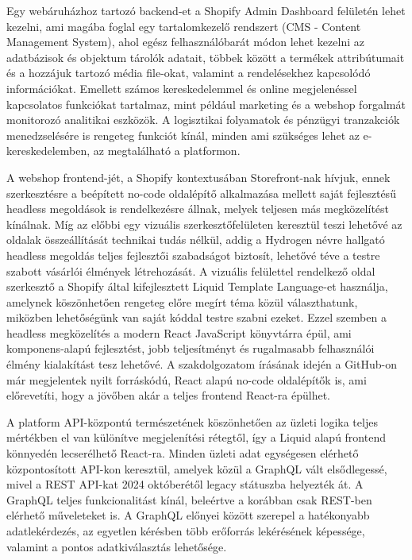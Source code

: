 \documentclass[12pt]{report}
\begin{document}
        Egy webáruházhoz tartozó backend-et a Shopify Admin Dashboard felületén lehet kezelni, ami magába foglal egy tartalomkezelő rendszert (CMS - Content Management System), ahol egész felhasználóbarát módon lehet kezelni az adatbázisok és objektum tárolók adatait, többek között a termékek attribútumait és a hozzájuk tartozó média file-okat, valamint a rendelésekhez kapcsolódó információkat. Emellett számos kereskedelemmel és online megjelenéssel kapcsolatos funkciókat tartalmaz, mint például marketing és a webshop forgalmát monitorozó analitikai eszközök. A logisztikai folyamatok és pénzügyi tranzakciók menedzselésére is rengeteg funkciót kínál, minden ami szükséges lehet az e-kereskedelemben, az megtalálható a platformon. 
        
        A webshop frontend-jét, a Shopify kontextusában Storefront-nak hívjuk, ennek szerkesztésre a beépített no-code oldalépítő alkalmazása mellett saját fejlesztésű headless megoldások is rendelkezésre állnak, melyek teljesen más megközelítést kínálnak. Míg az előbbi egy vizuális szerkesztőfelületen keresztül teszi lehetővé az oldalak összeállítását technikai tudás nélkül, addig a Hydrogen névre hallgató headless megoldás teljes fejlesztői szabadságot biztosít, lehetővé téve a testre szabott vásárlói élmények létrehozását. A vizuális felülettel rendelkező oldal szerkesztő a Shopify által kifejlesztett Liquid Template Language-et használja, amelynek köszönhetően rengeteg előre megírt téma közül választhatunk, miközben lehetőségünk van saját kóddal testre szabni ezeket. Ezzel szemben a headless megközelítés a modern React JavaScript könyvtárra épül, ami komponens-alapú fejlesztést, jobb teljesítményt és rugalmasabb felhasználói élmény kialakítást tesz lehetővé. A szakdolgozatom írásának idején a GitHub-on már megjelentek nyilt forráskódú, React alapú no-code oldalépítők is, ami előrevetíti, hogy a jövőben akár a teljes frontend React-ra épülhet.
        
        A platform API-központú természetének köszönhetően az üzleti logika teljes mértékben el van különítve megjelenítési rétegtől, így a Liquid alapú frontend könnyedén lecserélhető React-ra. Minden üzleti adat egységesen elérhető központosított API-kon keresztül, amelyek közül a GraphQL vált elsődlegessé, mivel a REST API-kat 2024 októberétől legacy státuszba helyezték át. A GraphQL teljes funkcionalitást kínál, beleértve a korábban csak REST-ben elérhető műveleteket is. A GraphQL előnyei között szerepel a hatékonyabb adatlekérdezés, az egyetlen kérésben több erőforrás lekérésének képessége, valamint a pontos adatkiválasztás lehetősége.
        
\end{document}

